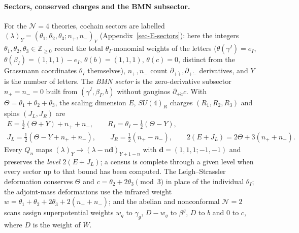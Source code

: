 \documentclass[11pt]{article}
\numberwithin{equation}{section}
\numberwithin{figure}{section}
\numberwithin{table}{section}
\begin{document}
\paragraph{Sectors, conserved charges and the BMN subsector.}
For the $\mathcal N=4$ theories, cochain sectors are labelled $(\lambda)_Y=(\theta_1,\theta_2,\theta_3;n_+,n_-)_Y$ (Appendix~\ref{sec-E-sectors}): here the integers $\theta_1,\theta_2,\theta_3\in\mathbb Z_{\ge0}$ record the total $\theta_I$-monomial weights of the letters ($\theta(\gamma^I)=e_I$, $\theta(\beta_I)=(1,1,1)-e_I$, $\theta(b)=(1,1,1)$, $\theta(c)=0$, distinct from the Grassmann coordinates $\theta_I$ themselves), $n_+,n_-$ count $\partial_{+\dot+},\partial_{+\dot-}$ derivatives, and $Y$ is the number of letters. The \emph{BMN sector} \cite{ChangYin,microstates} is the zero-derivative subsector $n_+=n_-=0$ built from $(\gamma^I,\beta_I,b)$ without gauginos $\partial_{+\dot a}c$. With $\Theta=\theta_1+\theta_2+\theta_3$, the scaling dimension $E$, $SU(4)_R$ charges $(R_1,R_2,R_3)$ and spins $(J_L,J_R)$ are
\begin{equation*}
\begin{gathered}
E=\tfrac12(\Theta+Y)+n_++n_-,\qquad R_I=\theta_I-\tfrac12(\Theta-Y),\\
J_L=\tfrac12(\Theta-Y+n_++n_-),\qquad J_R=\tfrac12(n_+-n_-),\qquad
2(E+J_L)=2\Theta+3(n_++n_-).
\end{gathered}
\end{equation*}
Every $Q_n$ maps $(\lambda)_Y\to(\lambda-n\mathbf d)_{Y+1-n}$ with $\mathbf d=(1,1,1;-1,-1)$ and preserves the \emph{level} $2(E+J_L)$; a census is complete through a given level when every sector up to that bound has been computed. The Leigh--Strassler deformation conserves $\Theta$ and $c=\theta_2+2\theta_3\pmod3$ in place of the individual $\theta_I$; the adjoint-mass deformations use the infrared weight $w=\theta_1+\theta_2+2\theta_3+2(n_++n_-)$; and the abelian and nonconformal $\mathcal N=2$ scans assign superpotential weights $w_g$ to $\gamma_g$, $D-w_g$ to $\beta^g$, $D$ to $b$ and $0$ to $c$, where $D$ is the weight of $\bar W$.
\end{document}
